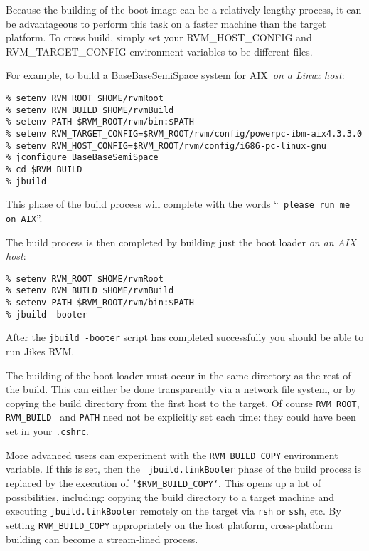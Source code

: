 Because the building of the boot image can be a relatively lengthy
process, it can be advantageous to perform this task 
on a faster machine than the target platform.  To cross build, simply
set your 
RVM\_HOST\_CONFIG and RVM\_TARGET\_CONFIG environment variables to
be different files.

For example, to build a BaseBaseSemiSpace system for AIX\AIXTMFootnote\
{\em on a Linux host}:
\begin{verbatim}
% setenv RVM_ROOT $HOME/rvmRoot
% setenv RVM_BUILD $HOME/rvmBuild
% setenv PATH $RVM_ROOT/rvm/bin:$PATH
% setenv RVM_TARGET_CONFIG=$RVM_ROOT/rvm/config/powerpc-ibm-aix4.3.3.0
% setenv RVM_HOST_CONFIG=$RVM_ROOT/rvm/config/i686-pc-linux-gnu
% jconfigure BaseBaseSemiSpace
% cd $RVM_BUILD
% jbuild
\end{verbatim}

This phase of the build process will complete with the words ``{\tt
  please run me on AIX}''.


The build process is then completed by building just the boot loader {\em
  on an AIX host}:

\begin{verbatim}
% setenv RVM_ROOT $HOME/rvmRoot
% setenv RVM_BUILD $HOME/rvmBuild
% setenv PATH $RVM_ROOT/rvm/bin:$PATH
% jbuild -booter
\end{verbatim}

After the {\tt jbuild -booter} script has completed successfully you should be able 
to run Jikes RVM. 

The building of the boot loader must occur in the same directory as
the rest of the build.  This can either be done transparently via a
network file system, or by copying the build directory from the first
host to the target.  Of course {\tt RVM\_ROOT}, {\tt RVM\_BUILD }
and {\tt PATH} need not be explicitly set each time: they could have
been set in your {\tt .cshrc}.

More advanced users can experiment with the {\tt RVM\_BUILD\_COPY}
environment variable.  If this is set, then the {\tt
  jbuild.linkBooter} phase of the build process is replaced by the
execution of {\tt `\$RVM\_BUILD\_COPY`}.  This opens up a lot of
possibilities, including: copying the build directory to a target
machine and executing {\tt jbuild.linkBooter} remotely on the target
via {\tt rsh} or {\tt ssh}, etc.  By setting {\tt RVM\_BUILD\_COPY}
appropriately on the host platform, cross-platform building can become
a stream-lined process.

\JikesAIXTMFooter

